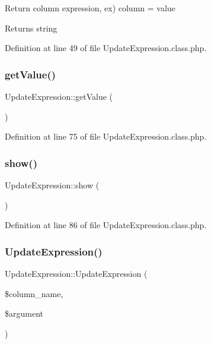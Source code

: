 Return column expression, ex) column = value \begin{DoxyReturn}{Returns}
string 
\end{DoxyReturn}


Definition at line 49 of file Update\+Expression.\+class.\+php.

\hypertarget{classUpdateExpression_a56d4244ba753a420fc8b6db3b10fc9f9}{}\label{classUpdateExpression_a56d4244ba753a420fc8b6db3b10fc9f9} 
\subsubsection{\texorpdfstring{get\+Value()}{getValue()}}
{\footnotesize\ttfamily Update\+Expression\+::get\+Value (\begin{DoxyParamCaption}{ }\end{DoxyParamCaption})}



Definition at line 75 of file Update\+Expression.\+class.\+php.

\hypertarget{classUpdateExpression_a3d3ea00a85cdf7e086139e4544e757e0}{}\label{classUpdateExpression_a3d3ea00a85cdf7e086139e4544e757e0} 
\subsubsection{\texorpdfstring{show()}{show()}}
{\footnotesize\ttfamily Update\+Expression\+::show (\begin{DoxyParamCaption}{ }\end{DoxyParamCaption})}



Definition at line 86 of file Update\+Expression.\+class.\+php.

\hypertarget{classUpdateExpression_a3e1cc24e9a7181ef791586f7607b86b9}{}\label{classUpdateExpression_a3e1cc24e9a7181ef791586f7607b86b9} 
\subsubsection{\texorpdfstring{Update\+Expression()}{UpdateExpression()}}
{\footnotesize\ttfamily Update\+Expression\+::\+Update\+Expression (\begin{DoxyParamCaption}\item[{}]{\$column\+\_\+name,  }\item[{}]{\$argument }\end{DoxyParamCaption})}

